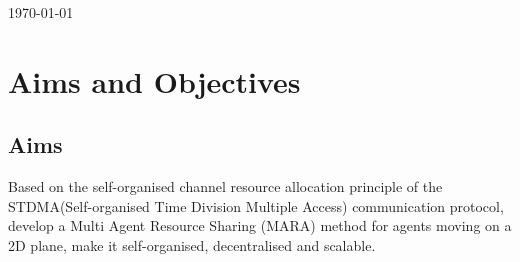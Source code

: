 \documentclass[12pt, oneside]{article}
\begin{document}
\begin{titlepage}
\begin{center}
        \vspace{0.8cm}
 
        \vspace{0.8cm}
        \today
        
    \end{center}
    
\end{titlepage}

\tableofcontents
\pagebreak


\section{Aims and Objectives}
\subsection{Aims}
Based on the self-organised channel resource allocation principle of the STDMA(Self-organised Time Division Multiple Access) \cite{STDMA} communication protocol, develop a Multi Agent Resource Sharing (MARA) \cite{MARA_Overview1} method for agents moving on a 2D plane, make it self-organised, decentralised and scalable. 
\end{document}

